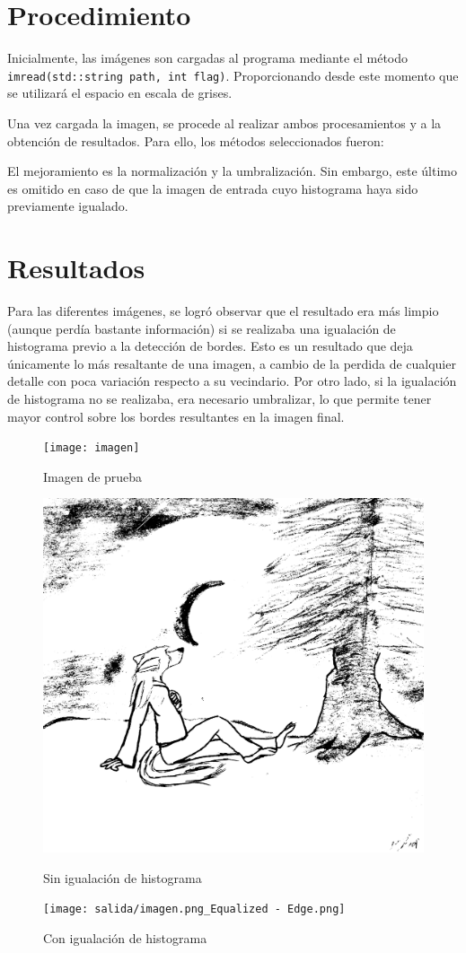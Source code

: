 \documentclass[10pt]{IEEEtran}
\begin{document}
  \section{Procedimiento}
  Inicialmente, las imágenes son cargadas al programa mediante el método \texttt{imread(std::string path, int flag)}. Proporcionando desde
  este momento que se utilizará el espacio en escala de grises.

  Una vez cargada la imagen, se procede al realizar ambos procesamientos y a la obtención de resultados.
  Para ello, los métodos seleccionados fueron:
  

  El mejoramiento es la normalización y la umbralización. Sin embargo, este último es omitido en caso de que la imagen de entrada cuyo histograma 
  haya sido previamente igualado.
  

  \section{Resultados}
  Para las diferentes imágenes, se logró observar que el resultado era más limpio (aunque perdía bastante información) si se realizaba una igualación
  de histograma previo a la detección de bordes. Esto es un resultado que deja únicamente lo más resaltante de una imagen, a cambio de la perdida de
  cualquier detalle con poca variación respecto a su vecindario. Por otro lado, si la igualación de histograma no se realizaba, era necesario umbralizar,
  lo que permite tener mayor control sobre los bordes resultantes en la imagen final.

  \begin{figure}[!ht]
    \texttt{[image: imagen]}
    \caption{Imagen de prueba}

    \includegraphics[width=0.6\linewidth]{salida/imagen.png_Edge.png}
    \caption{Sin igualación de histograma}

    \texttt{[image: salida/imagen.png\_Equalized - Edge.png]}
    \caption{Con igualación de histograma}
  \end{figure}
\end{document}
